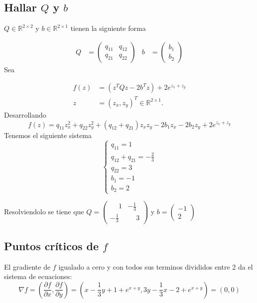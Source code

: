 \documentclass{endm}
\begin{document}
\subsection{Hallar $Q$ y $b$}
$Q \in \mathbb{R}^{2\times2}$ y $b \in \mathbb{R}^{2\times1}$ tienen la siguiente forma

\begin{align}
    Q &= \begin{pmatrix} q_{11} & q_{12} \\ q_{21} & q_{22} \end{pmatrix} & b &= \begin{pmatrix} b_1 \\ b_2 \end{pmatrix}
\end{align}
Sea

\begin{align} 
    f(z) &= (z^{T}Qz - 2b^{T}z) + 2e^{z_x+z_y} \\
    z &= (z_x,z_y)^T \in \mathbb{R}^{2\times1}.
\end{align}
Desarrollando
\begin{equation}
    f(z) = q_{11}z_x^2 + q_{22}z_y^2 + (q_{12} + q_{21})z_x z_y - 2b_1 z_x - 2b_2z_y + 2e^{z_x+z_y}
\end{equation}
Tenemos el siguiente sistema
\begin{equation}
\begin{cases}
q_{11} = 1 \\
q_{12} + q_{21} = -\frac{2}{3} \\
q_{22} = 3 \\
b_1 = -1 \\
b_2 = 2
\end{cases}
\end{equation}

Resolviendolo se tiene que
$Q =  \begin{pmatrix} \phantom{-}1 & -\frac{1}{3} \\ -\frac{1}{3} & \phantom{-}3\end{pmatrix} $
y
$b = \begin{pmatrix} -1\\ 2 \end{pmatrix}$

\subsection{Puntos críticos de $f$}
El gradiente de $f$ igualado a cero y con todos sus terminos divididos entre 2 da el sistema de ecuaciones:
\begin{equation}
\nabla f = \left( \frac{\partial f}{\partial x}, \frac{\partial f}{\partial y} \right)
=
\left( x - \frac{1}{3}y + 1 + e^{x+y}, 3y - \frac{1}{3}x - 2 + e^{x+y} \right) = (0,0)
\end{equation}
\end{document}
